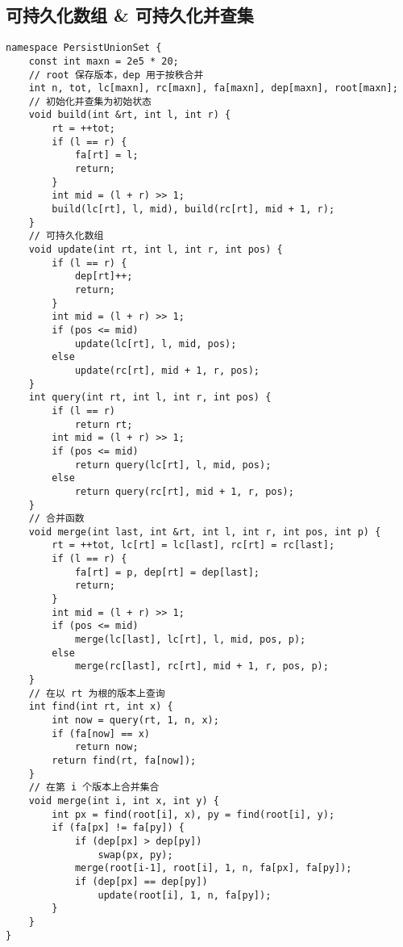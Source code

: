 \subsection{可持久化数组 \& 可持久化并查集}

\begin{verbatim}
namespace PersistUnionSet {
    const int maxn = 2e5 * 20;
    // root 保存版本，dep 用于按秩合并 
    int n, tot, lc[maxn], rc[maxn], fa[maxn], dep[maxn], root[maxn];
    // 初始化并查集为初始状态 
    void build(int &rt, int l, int r) {
        rt = ++tot;
        if (l == r) {
            fa[rt] = l;
            return;
        }
        int mid = (l + r) >> 1;
        build(lc[rt], l, mid), build(rc[rt], mid + 1, r);
    }
    // 可持久化数组
    void update(int rt, int l, int r, int pos) {
        if (l == r) {
            dep[rt]++;
            return;
        }
        int mid = (l + r) >> 1;
        if (pos <= mid)
            update(lc[rt], l, mid, pos);
        else
            update(rc[rt], mid + 1, r, pos);
    }
    int query(int rt, int l, int r, int pos) {
        if (l == r)
            return rt;
        int mid = (l + r) >> 1;
        if (pos <= mid)
            return query(lc[rt], l, mid, pos);
        else
            return query(rc[rt], mid + 1, r, pos);
    }
    // 合并函数
    void merge(int last, int &rt, int l, int r, int pos, int p) {
        rt = ++tot, lc[rt] = lc[last], rc[rt] = rc[last];
        if (l == r) {
            fa[rt] = p, dep[rt] = dep[last];
            return;
        }
        int mid = (l + r) >> 1;
        if (pos <= mid)
            merge(lc[last], lc[rt], l, mid, pos, p);
        else
            merge(rc[last], rc[rt], mid + 1, r, pos, p);
    }    
    // 在以 rt 为根的版本上查询 
    int find(int rt, int x) {
        int now = query(rt, 1, n, x);
        if (fa[now] == x)
            return now;
        return find(rt, fa[now]);
    }
    // 在第 i 个版本上合并集合 
    void merge(int i, int x, int y) {
        int px = find(root[i], x), py = find(root[i], y);
        if (fa[px] != fa[py]) {
            if (dep[px] > dep[py])
                swap(px, py);
            merge(root[i-1], root[i], 1, n, fa[px], fa[py]);
            if (dep[px] == dep[py])
                update(root[i], 1, n, fa[py]);
        }
    }
}
\end{verbatim}
